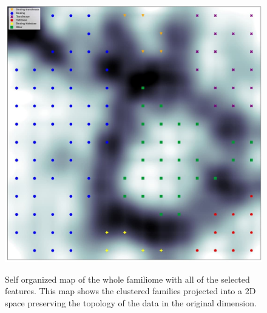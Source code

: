 \documentclass[preprint,12pt]{elsarticle}
\begin{document}
\begin{figure}[htb]
	\centering
	\includegraphics[width=\linewidth]{images/04_SOM.jpg}
	\label{fig:som}
	\endminipage
	\caption{Self organized map of the whole familiome with all of the selected features.
	This map shows the clustered families projected into a 2D space preserving the topology of the data in the original dimension.}
\end{figure}

\clearpage
\end{document}
